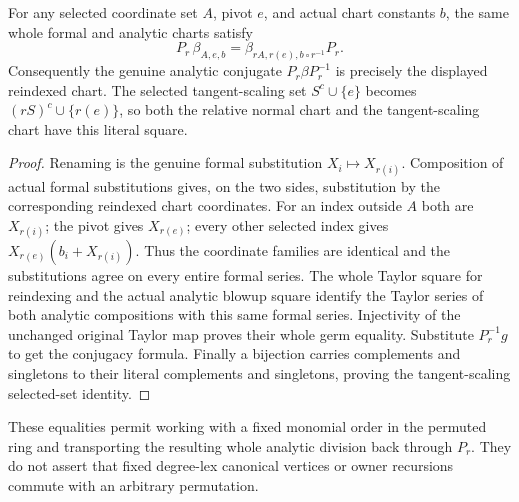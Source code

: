 \begin{theorem}
\label{hir:actual-normal-reindex-chart-conjugacy}
\leanok
For any selected coordinate set $A$, pivot $e$, and actual chart constants
$b$, the same whole formal and analytic charts satisfy
\[
 P_r\,\beta_{A,e,b}=\beta_{rA,r(e),b\circ r^{-1}}P_r.
\]
Consequently the genuine analytic conjugate $P_r\beta P_r^{-1}$ is precisely
the displayed reindexed chart. The selected tangent-scaling set
$S^c\cup\{e\}$ becomes $(rS)^c\cup\{r(e)\}$, so both the relative normal
chart and the tangent-scaling chart have this literal square.
\end{theorem}
\begin{proof}
Renaming is the genuine formal substitution $X_i\mapsto X_{r(i)}$.
Composition of actual formal substitutions gives, on the two sides,
substitution by the corresponding reindexed chart coordinates. For an
index outside $A$ both are $X_{r(i)}$; the pivot gives $X_{r(e)}$; every
other selected index gives
$X_{r(e)}(b_i+X_{r(i)})$. Thus the coordinate families are identical and
the substitutions agree on every entire formal series. The whole Taylor
square for reindexing and the actual analytic blowup square identify the
Taylor series of both analytic compositions with this same formal series.
Injectivity of the unchanged original Taylor map proves their whole germ
equality. Substitute $P_r^{-1}g$ to get the conjugacy formula. Finally a
bijection carries complements and singletons to their literal complements
and singletons, proving the tangent-scaling selected-set identity.
\end{proof}

These equalities permit working with a fixed monomial order in the permuted
ring and transporting the resulting whole analytic division back through
$P_r$. They do not assert that fixed degree-lex canonical vertices or owner
recursions commute with an arbitrary permutation.
